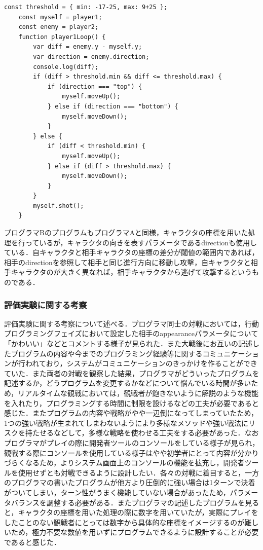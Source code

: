 \begin{itemize}
  \begin{lstlisting}[caption=プログラマB, label=shimizu]
    const threshold = { min: -17-25, max: 9+25 };
    const myself = player1;
    const enemy = player2;
    function player1Loop() {
        var diff = enemy.y - myself.y;
        var direction = enemy.direction;
        console.log(diff);
        if (diff > threshold.min && diff <= threshold.max) {
            if (direction === "top") {
                myself.moveUp();
            } else if (direction === "bottom") {
                myself.moveDown();
            }
        } else {
            if (diff < threshold.min) {
                myself.moveUp();
            } else if (diff > threshold.max) {
                myself.moveDown();
            }
        }
        myself.shot();
    }
  \end{lstlisting}
  プログラマBのプログラムもプログラマAと同様，キャラクタの座標を用いた処理を行っているが，キャラクタの向きを表すパラメータであるdirectionも使用している．自キャラクタと相手キャラクタの座標の差分が閾値の範囲内であれば，相手のdirectionを参照して相手と同じ進行方向に移動し攻撃，自キャラクタと相手キャラクタのが大きく異なれば，相手キャラクタから逃げて攻撃するというものである．

\end{itemize}


\subsubsection{評価実験に関する考察}

評価実験に関する考察について述べる．プログラマ同士の対戦においては，行動プログラミングフェイズにおいて設定した相手のappearanceパラメータについて「かわいい」などとコメントする様子が見られた．また大戦後にお互いの記述したプログラムの内容や今までのプログラミング経験等に関するコミュニケーションが行われており，システムがコミュニケーションのきっかけを作ることができていた．また両者の対戦を観察した結果，プログラマがどういったプログラムを記述するか，どうプログラムを変更するかなどについて悩んでいる時間が多いため，リアルタイムな観戦においては，観戦者が飽きないように解説のような機能を入れたり，プログラミングする時間に制限を設けるなどの工夫が必要であると感じた．またプログラムの内容や戦略がやや一辺倒になってしまっていたため，1つの強い戦略が生まれてしまわないようにより多様なメソッドや強い戦法にリスクを持たせるなどして，多様な戦略を使わせる工夫をする必要があった．なおプログラマがプレイの際に開発者ツールのコンソールをしている様子が見られ，観戦する際にコンソールを使用している様子はやや初学者にとって内容が分かりづらくなるため，よりシステム画面上のコンソールの機能を拡充し，開発者ツールを使用せずとも対戦できるように設計したい．各々の対戦に着目すると，一方のプログラマの書いたプログラムが他方より圧倒的に強い場合は1ターンで決着がついてしまい，ターン性がうまく機能していない場合があったため，パラメータバランスを調整する必要がある．またプログラマの記述したプログラムを見ると，キャラクタの座標を用いた処理の際に数字を用いていたが，実際にプレイをしたことのない観戦者にとっては数字から具体的な座標をイメージするのが難しいため，極力不要な数値を用いずにプログラムできるように設計することが必要であると感じた．

